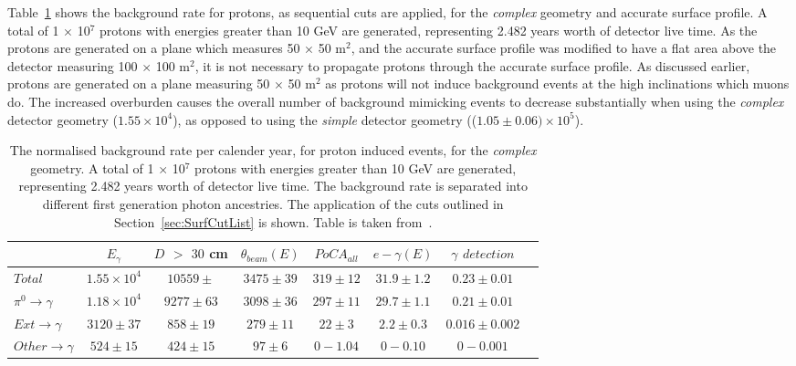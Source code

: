 Table~\ref{tab:SurfProComp} shows the background rate for protons, as sequential cuts are applied, for the \emph{complex} geometry and accurate surface profile. A total of 1 $\times$ 10$^7$ protons with energies greater than 10 GeV are generated, representing 2.482 years worth of detector live time. As the protons are generated on a plane which measures 50 $\times$ 50 m$^{2}$, and the accurate surface profile was modified to have a flat area above the detector measuring 100 $\times$ 100 m$^{2}$, it is not necessary to propagate protons through the accurate surface profile. As discussed earlier, protons are generated on a plane measuring 50 $\times$ 50 m$^{2}$ as protons will not induce background events at the high inclinations which muons do. The increased overburden causes the overall number of background mimicking events to decrease substantially when using the \emph{complex} detector geometry ($1.55\times10^4$), as opposed to using the \emph{simple} detector geometry (($1.05\pm0.06)\times10^5$). \\

\begin{table}
  \caption[The normalised background rate per calender year, for proton induced events, for the \emph{complex} geometry]
          {The normalised background rate per calender year, for proton induced events, for the \emph{complex} geometry. A total of 1 $\times$ 10$^7$ protons with energies greater than 10 GeV are generated, representing 2.482 years worth of detector live time. The background rate is separated into different first generation photon ancestries. The application of the cuts outlined in Section~\ref{sec:SurfCutList} is shown. Table is taken from~\citep{MartinsThesis}.}
  \label{tab:SurfProComp}
  \centering
  \scriptsize
  \begin{tabular}{l c c c c c c c }
    \toprule
        & $E_\gamma$ &  $D$ $>$ $30$ cm & $\theta_{beam}(E)$ & $PoCA_{all}$ & $e-\gamma(E)$ & $\gamma$ $detection$ \\
        \midrule
        $Total$          & $1.55\times10^4$ & $10559\pm$  & $3475\pm39$ & $319\pm12$ & $31.9\pm1.2$ & $0.23\pm0.01$ \\

        $\pi^0\to\gamma$ & $1.18\times10^4$ & $9277\pm63$  & $3098\pm36$ & $297\pm11$ & $29.7\pm1.1$ & $0.21\pm0.01$ \\

        $Ext\to\gamma$   & $3120\pm37$      & $858\pm19$   & $279\pm11$  & $22\pm3$   & $2.2\pm0.3$  & $0.016\pm0.002$ \\

        $Other\to\gamma$ & $524\pm15$       & $424\pm15$   & $97\pm6$    & $0-1.04$   & $0-0.10$     & $0-0.001$ \\
        \bottomrule
  \end{tabular}
\end{table}

